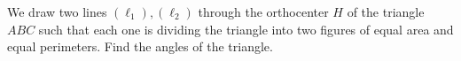 We draw two lines $(\ell_1) , (\ell_2)$ through the orthocenter $H$ of the triangle $ABC$ such that each one is dividing the triangle into two figures of equal area and equal perimeters. Find the angles of the triangle.